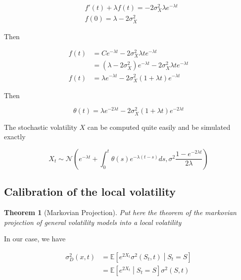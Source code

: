\documentclass{article}
\newtheorem{theorem}{Theorem}[section]
\begin{document}
\begin{equation}
\begin{aligned}
	& f'(t) + \lambda f(t) = -2 \sigma_X^2 \lambda e^{-\lambda t}\\
	&f(0) = \lambda - 2\sigma_X^2
\end{aligned}
\end{equation}

\noindent Then

\begin{equation}
\begin{aligned}
	f(t) &= Ce^{-\lambda t} - 2 \sigma_X^2 \lambda t e^{-\lambda t}\\
	&= \left(\lambda - 2\sigma_X^2 \right) e^{-\lambda t} - 2 \sigma_X^2 \lambda t e^{-\lambda t}\\
	f(t) &= \lambda e^{-\lambda t} - 2\sigma_X^2 (1 + \lambda t) e^{-\lambda t}
\end{aligned}
\end{equation}

\noindent Then

\begin{equation}
	\theta(t) = \lambda e^{-2\lambda t} -2 \sigma_X^2 (1 + \lambda t) e^{-2\lambda t}
\end{equation}

\noindent The stochastic volatility $X$ can be computed quite easily and be simulated exactly

\begin{equation}
	X_t \sim \mathcal{N}\left(e^{-\lambda t} + \int_0^t \theta(s) e^{-\lambda (t-s)} ds, \sigma^2 \frac{1 - e^{-2\lambda t}}{2\lambda}\right)
\end{equation}

\subsection{Calibration of the local volatility}

\begin{theorem}[Markovian Projection]
Put here the theorem of the markovian projection of general volatility models into a local volatility
\end{theorem}

\noindent In our case, we have

\begin{equation}
\begin{aligned}
	\sigma_D^2(x, t) &= \mathbb{E} \left[ e^{2X_t} \sigma^2(S_t, t) \middle| S_t = S\right]\\
	&= \mathbb{E}\left[e^{2X_t} \middle| S_t = S \right] \sigma^2(S,t)
\end{aligned}
\end{equation}
\end{document}
